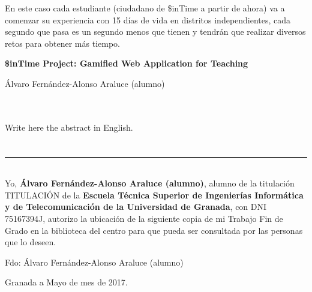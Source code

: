 En este caso cada estudiante (ciudadano de \$inTime a partir de ahora) va a comenzar su experiencia con 15 días de vida en distritos independientes, cada segundo que pasa es un segundo menos que tienen y tendrán que realizar diversos retos para obtener más tiempo.

\cleardoublepage


\thispagestyle{empty}


\begin{center}
{\large\bfseries \$inTime Project: Gamified Web Application for Teaching}\\
\end{center}
\begin{center}
Álvaro Fernández-Alonso Araluce (alumno)\\
\end{center}

\\

\vspace{0.7cm}
\\

Write here the abstract in English.

\chapter*{}
\thispagestyle{empty}

\noindent\rule[-1ex]{\textwidth}{2pt}\\[4.5ex]

Yo, \textbf{Álvaro Fernández-Alonso Araluce (alumno)}, alumno de la titulación TITULACIÓN de la \textbf{Escuela Técnica Superior
de Ingenierías Informática y de Telecomunicación de la Universidad de Granada}, con DNI 75167394J, autorizo la
ubicación de la siguiente copia de mi Trabajo Fin de Grado en la biblioteca del centro para que pueda ser
consultada por las personas que lo deseen.

\vspace{6cm}

\noindent Fdo: Álvaro Fernández-Alonso Araluce (alumno)

\vspace{2cm}

\begin{flushright}
Granada a Mayo de mes de 2017.
\end{flushright}


\chapter*{}
\thispagestyle{empty}

